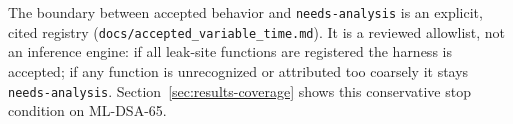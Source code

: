 The boundary between accepted behavior and \texttt{needs-analysis} is an
explicit, cited registry (\texttt{docs/accepted\_variable\_time.md}). It is a
reviewed allowlist, not an inference engine: if all leak-site functions are
registered the harness is accepted; if any function is unrecognized or attributed
too coarsely it stays \texttt{needs-analysis}. Section~\ref{sec:results-coverage}
shows this conservative stop condition on ML-DSA-65.
